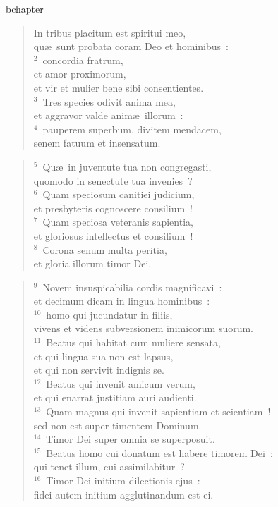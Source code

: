 bchapter\begin{verse}\vspace{-19pt}In tribus placitum est spiritui meo,\\ qu\ae\ sunt probata coram Deo et hominibus~:\\
${}^{2}$~concordia fratrum,\\ et amor proximorum,\\ et vir et mulier bene sibi consentientes.\\
${}^{3}$~Tres species odivit anima mea,\\ et aggravor valde anim\ae\ illorum~:\\
${}^{4}$~pauperem superbum, divitem mendacem,\\ senem fatuum et insensatum.\end{verse}


\begin{verse}${}^{5}$~Qu\ae\ in juventute tua non congregasti,\\ quomodo in senectute tua invenies~?\\
${}^{6}$~Quam speciosum canitiei judicium,\\ et presbyteris cognoscere consilium~!\\
${}^{7}$~Quam speciosa veteranis sapientia,\\ et gloriosus intellectus et consilium~!\\
${}^{8}$~Corona senum multa peritia,\\ et gloria illorum timor Dei.\end{verse}


\begin{verse}${}^{9}$~Novem insuspicabilia cordis magnificavi~:\\ et decimum dicam in lingua hominibus~:\\
${}^{10}$~homo qui jucundatur in filiis,\\ vivens et videns subversionem inimicorum suorum.\\
${}^{11}$~Beatus qui habitat cum muliere sensata,\\ et qui lingua sua non est lapsus,\\ et qui non servivit indignis se.\\
${}^{12}$~Beatus qui invenit amicum verum,\\ et qui enarrat justitiam auri audienti.\\
${}^{13}$~Quam magnus qui invenit sapientiam et scientiam~!\\ sed non est super timentem Dominum.\\
${}^{14}$~Timor Dei super omnia se superposuit.\\
${}^{15}$~Beatus homo cui donatum est habere timorem Dei~:\\ qui tenet illum, cui assimilabitur~?\\
${}^{16}$~Timor Dei initium dilectionis ejus~:\\ fidei autem initium agglutinandum est ei.\end{verse}


